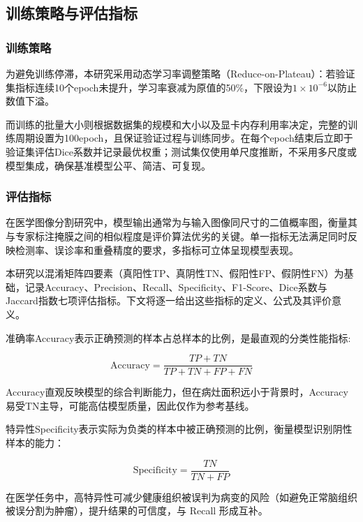 \subsection{训练策略与评估指标}

\subsubsection{训练策略}

为避免训练停滞，本研究采用动态学习率调整策略（Reduce-on-Plateau）：若验证集指标连续10个epoch未提升，学习率衰减为原值的50\%，下限设为$1 \times 10^{-6}$以防止数值下溢。

而训练的批量大小则根据数据集的规模和大小以及显卡内存利用率决定，完整的训练周期设置为100epoch，且保证验证过程与训练同步。在每个epoch结束后立即于验证集评估Dice系数并记录最优权重；测试集仅使用单尺度推断，不采用多尺度或模型集成，确保基准模型公平、简洁、可复现。

\subsubsection{评估指标}

在医学图像分割研究中，模型输出通常为与输入图像同尺寸的二值概率图，衡量其与专家标注掩膜之间的相似程度是评价算法优劣的关键。单一指标无法满足同时反映检测率、误诊率和重叠精度的要求，多指标可立体呈现模型表现。

本研究以混淆矩阵四要素（真阳性TP、真阴性TN、假阳性FP、假阴性FN）为基础，记录Accuracy、Precision、Recall、Specificity、F1-Score、Dice系数与Jaccard指数七项评估指标。下文将逐一给出这些指标的定义、公式及其评价意义。

准确率Accuracy表示正确预测的样本占总样本的比例，是最直观的分类性能指标:

\begin{equation}
    \mathrm{Accuracy}=\frac{TP+TN}{TP+TN+FP+FN}
\end{equation}

Accuracy直观反映模型的综合判断能力，但在病灶面积远小于背景时，Accuracy易受TN主导，可能高估模型质量，因此仅作为参考基线。

特异性Specificity表示实际为负类的样本中被正确预测的比例，衡量模型识别阴性样本的能力：

\begin{equation}
    \mathrm{Specificity}=\frac{T N}{T N+F P}
\end{equation}

在医学任务中，高特异性可减少健康组织被误判为病变的风险（如避免正常脑组织被误分割为肿瘤），提升结果的可信度，与 Recall 形成互补。

